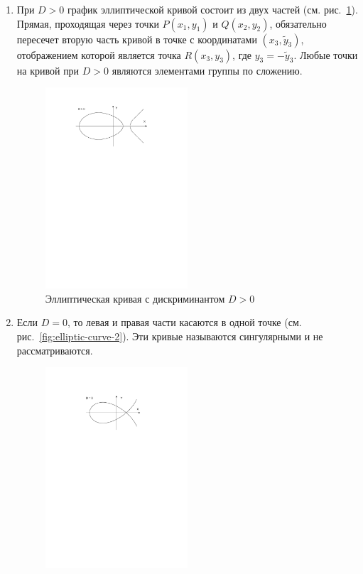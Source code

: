\begin{enumerate}
    \item При $D>0$ график эллиптической кривой состоит из двух частей (см. рис.~\ref{fig:elliptic-curve-1}). Прямая, проходящая через точки $P(x_1, y_1)$ и $Q(x_2, y_2)$, обязательно пересечет вторую часть кривой в точке с координатами $(x_3, \widetilde{y}_3)$, отображением которой является точка $R(x_3, y_3)$, где $y_3 = - \widetilde{y}_3$. Любые точки на кривой при $D>0$ являются элементами группы по сложению.
        \begin{figure}[!ht]
        	\centering
        	\includegraphics[width=0.5\textwidth]{pic/elliptic-curve-1}
            \caption{Эллиптическая кривая с дискриминантом $D>0$\label{fig:elliptic-curve-1}}
        \end{figure}
    \item Если $D=0$, то левая и правая части касаются в одной точке (см. рис.~\ref{fig:elliptic-curve-2}). Эти кривые называются сингулярными и не рассматриваются.
        \begin{figure}[!ht]
        	\centering
        	\includegraphics[width=0.5\textwidth]{pic/elliptic-curve-2}

\end{figure}
\end{enumerate}
